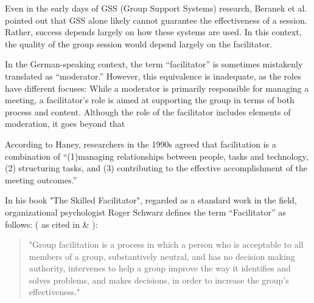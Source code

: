 Even in the early days of GSS (Group Support Systems) research, Beranek et al. pointed out that GSS
alone likely cannot guarantee the effectiveness of a session. Rather, success
depends largely on how these systems are used. \cite[p. 147] {beranekFacilitationGroupSupport1993}
In this context, the quality of the group session would depend largely on the facilitator.
\cite[p.146]{beranekFacilitationGroupSupport1993}

In the German-speaking context, the term “facilitator” is sometimes mistakenly translated as “moderator.” However, this
equivalence is inadequate, as the roles have different focuses: While a
moderator is primarily responsible for managing a meeting, a facilitator’s role is aimed at
supporting the group in terms of both process and content. Although the role of the facilitator includes
elements of moderation,
it goes beyond that

According to Haney, researchers in the 1990s agreed that facilitation is a combination of
“(1)managing relationships between people, tasks and technology, (2) structuring tasks, and (3) contributing to
the effective accomplishment of the meeting outcomes.” \cite[p. 73]{hayneFacilitatorsPerspectiveMeetings}

In his book "The Skilled Facilitator", regarded as a standard work in the field, organizational
psychologist Roger Schwarz defines the term “Facilitator” as follows:
(\cite{schwarzSkilledFacilitatorComprehensive2016} as cited in
\cite{parsonsdialogueWhatMakesGood} \& \cite[p.9]{aj&smartFacilitationFundamentalsWorkbook}):

\begin{quote}
  "Group facilitation is a process in which a person who is acceptable to all members of a group,
  substantively neutral, and has no decision making authority, intervenes to help a group improve the way it
  identifies and solves problems, and makes decisions, in order to increase the group’s effectiveness."
\end{quote}

